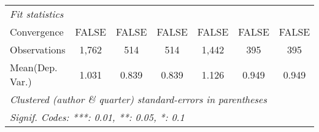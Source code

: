\begin{tabular}{lcccccc}
   \midrule
   \emph{Fit statistics}\\
   Convergence             &FALSE    & FALSE   & FALSE        & FALSE   & FALSE   & FALSE\\  
   Observations            & 1,762   & 514     & 514          & 1,442   & 395     & 395\\  
Mean(Dep. Var.) & 1.031 & 0.839 & 0.839 & 1.126 & 0.949 & 0.949 \\
   \midrule \midrule
   \multicolumn{7}{l}{\emph{Clustered (author \& quarter) standard-errors in parentheses}}\\
   \multicolumn{7}{l}{\emph{Signif. Codes: ***: 0.01, **: 0.05, *: 0.1}}\\
\end{tabular}
\par\endgroup

